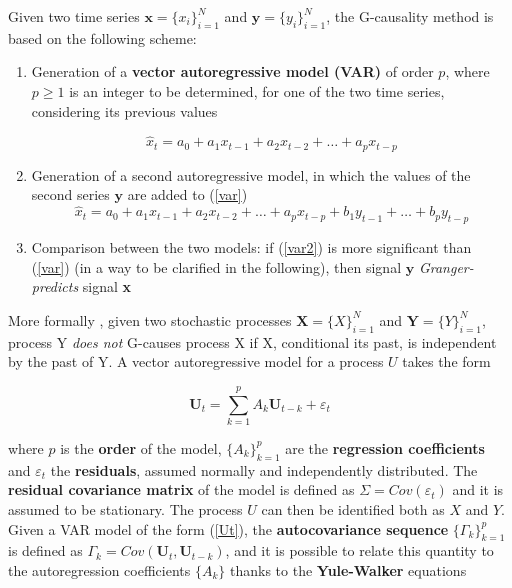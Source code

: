 \documentclass[12pt, a4paper]{report}
\begin{document}
Given two time series $ \textbf{x} = \{x_i\}_{i=1}^N$ and  $\textbf{y} = \{y_i\}_{i=1}^N$, the G-causality method is based on the following scheme:

\begin{enumerate}
	
	\item Generation of a \textbf{vector autoregressive model (VAR)} of order $p$, where $p\ge 1$ is an integer to be determined, for one of the two time series, considering its previous values
	
	\begin{equation}
	\hat{x}_t = a_0 + a_1 x_{t-1} + a_2 x_{t-2} + \dots + a_p x_{t-p} \label{var}
	\end{equation}
	
	
	\item Generation of a second autoregressive model, in which the values of the second series $\textbf{y}$ are added  to  (\ref{var})
	\begin{equation}
	\hat{x}_t = a_0 + a_1 x_{t-1} + a_2 x_{t-2} + \dots + a_p x_{t-p} + b_1 y_{t-1} + \dots + b_p y_{t-p} \label{var2}
	\end{equation}
	
	
	\item Comparison between the two models: if  (\ref{var2}) is more significant  than  (\ref{var}) (in a way to be clarified in the following), then signal $\textbf{y}$ \textit{Granger-predicts} signal \textbf{x} 
	
\end{enumerate}

More formally \cite{19}, %
given two stochastic processes $ \textbf{X} = \{X\}_{i=1}^N $ and $ \textbf{Y} = \{Y\}_{i=1}^N $, process Y \textit{does not} G-causes process X if X, conditional its past, is independent by the past of Y. A vector autoregressive model for a process $U$ takes the form

\begin{equation}
\textbf{U}_t = \sum_{k=1}^{p} A_k \textbf{U}_{t-k} + \varepsilon_t \label{Ut}
\end{equation}



where $p$ is the \textbf{order} of the model, $\{ A_k\}_{k=1}^p$ are the \textbf{regression coefficients} and $\varepsilon_t$ the \textbf{residuals}, assumed normally and independently distributed. The \textbf{ residual covariance matrix} of the model is defined as $ \Sigma = Cov(\varepsilon_t) $ and it is assumed to be stationary. The process $U$ can then be identified both as $X$ and $Y$. Given a VAR model of the form (\ref{Ut}), the \textbf{autocovariance sequence} $ \{\Gamma_k\}_{k=1}^p $ is defined as $ \Gamma_k = Cov(\textbf{U}_t,\textbf{U}_{t-k})$, and it is possible to relate this quantity to the autoregression coefficients $\{ A_k\}$ thanks to the \textbf{Yule-Walker} equations \cite{20} %
\end{document}
